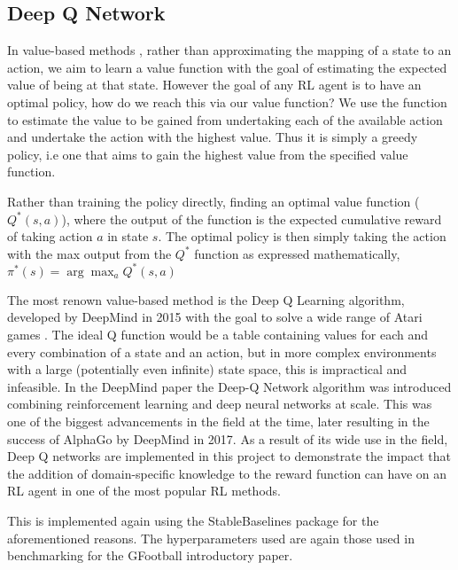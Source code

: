 \documentclass[11pt]{article}
\begin{document}
\subsection{Deep Q Network}

In value-based methods \cite{arulkumaran2017deep}, rather than approximating the mapping of a state to an action, we aim to learn a value function with the goal of estimating the expected value of being at that state. However the goal of any RL agent is to have an optimal policy, how do we reach this via our value function? We use the function to estimate the value to be gained from undertaking each of the available action and undertake the action with the highest value. Thus it is simply a greedy policy, i.e one that aims to gain the highest value from the specified value function.

Rather than training the policy directly, finding an optimal value function ($Q^*(s,a)$), where the output of the function is the expected cumulative reward of taking action $a$ in state $s$. The optimal policy is then simply taking the action with the max output from the $Q^*$ function as expressed mathematically, $ \pi^*(s)=\arg \max _a Q^*(s, a)$ 

The most renown value-based method is the Deep Q Learning algorithm, developed by DeepMind in 2015 with the goal to solve a wide range of Atari games \cite{Mnih2013}. The ideal Q function would be a table containing values for each and every combination of a state and an action, but in more complex environments with a large (potentially even infinite) state space, this is impractical and infeasible. In the DeepMind paper the Deep-Q Network algorithm was introduced combining reinforcement learning and deep neural networks at scale. This was one of the biggest advancements in the field at the time, later resulting in the success of AlphaGo by DeepMind in 2017. As a result of its wide use in the field, Deep Q networks are implemented in this project to demonstrate the impact that the addition of domain-specific knowledge to the reward function can have on an RL agent in one of the most popular RL methods.

This is implemented again using the StableBaselines package for the aforementioned reasons. The hyperparameters used are again those used in benchmarking for the GFootball introductory paper.
\end{document}
